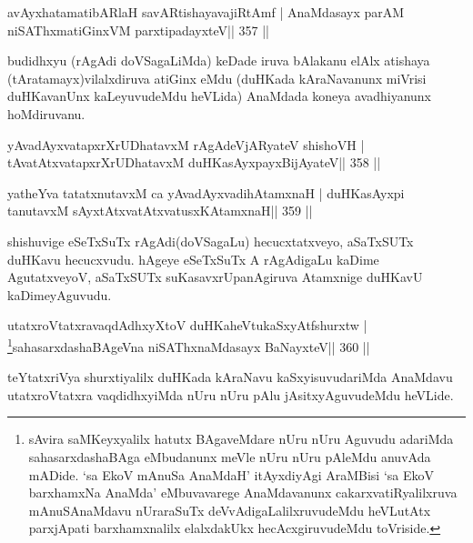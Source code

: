 \begin{shl}
avAyxhatamatibARlaH savARtishayavajiRtAmf |
AnaMdasayx parAM niSAThxmatiGinxVM parxtipadayxteV\hfill || 357 ||
\end{shl}

\begin{artha}
budidhxyu (rAgAdi doVSagaLiMda) keDade iruva bAlakanu elAlx atishaya (tAratamayx)vilalxdiruva atiGinx eMdu (duHKada kAraNavanunx miVrisi duHKavanUnx kaLeyuvudeMdu heVLida) AnaMdada koneya avadhiyanunx hoMdiruvanu.
\end{artha}


\begin{shl}
yAvadAyxvatapxrXrUDhatavxM rAgAdeVjARyateV shishoVH |
tAvatAtxvatapxrXrUDhatavxM duHKasAyxpayxBijAyateV\hfill || 358 ||
\end{shl}

\begin{shl}
yatheYva tatatxnutavxM ca yAvadAyxvadihA\s\s tamxnaH |
duHKasAyxpi tanutavxM sAyxtAtxvatAtxvatusxKAtamxnaH\hfill || 359 ||
\end{shl}

\begin{artha}
shishuvige eSeTxSuTx rAgAdi(doVSagaLu) hecucxtatxveyo, aSaTxSUTx 
duHKavu hecucxvudu. hAgeye eSeTxSuTx A rAgAdigaLu kaDime AgutatxveyoV, 
aSaTxSUTx suKasavxrUpanAgiruva Atamxnige duHKavU kaDimeyAguvudu. 
\end{artha}



\begin{shl}
utatxroVtatxravaqdAdhxyX\s toV duHKaheVtukaSxyAtfshurxtw |
\footnote{sAvira saMKeyxyalilx hatutx BAgaveMdare nUru nUru  Aguvudu adariMda sahasarxdashaBAga eMbudanunx meVle nUru nUru pAleMdu  anuvAda mADide. `sa EkoV mAnuSa AnaMdaH' itAyxdiyAgi AraMBisi  `sa EkoV barxhamxNa AnaMda' eMbuvavarege AnaMdavanunx  cakarxvatiRyalilxruva mAnuSAnaMdavu nUraraSuTx deVvAdigaLalilxruvudeMdu heVLutAtx parxjApati barxhamxnalilx elalxdakUkx hecAcxgiruvudeMdu toVriside.}sahasarxdashaBAgeVna niSAThx\s\s naMdasayx BaNayxteV\hfill || 360 ||
\end{shl}

\begin{artha}
teYtatxriVya shurxtiyalilx duHKada kAraNavu kaSxyisuvudariMda AnaMdavu utatxroVtatxra vaqdidhxyiMda nUru nUru pAlu jAsitxyAguvudeMdu heVLide.
\end{artha}

